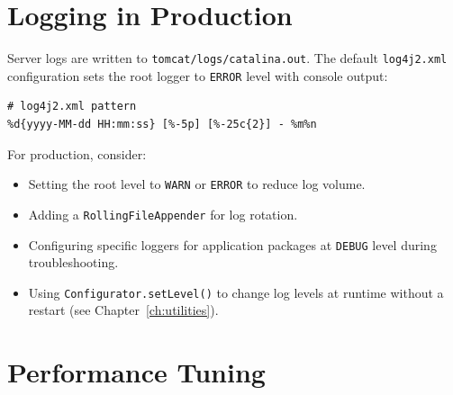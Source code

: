 \section{Logging in Production}
\label{sec:deploy-logging}

Server logs are written to \texttt{tomcat/logs/catalina.out}.  The default \texttt{log4j2.xml} configuration sets the root logger to \texttt{ERROR} level with console output:

\begin{lstlisting}[style=ini]
# log4j2.xml pattern
%d{yyyy-MM-dd HH:mm:ss} [%-5p] [%-25c{2}] - %m%n
\end{lstlisting}

\noindent
For production, consider:

\begin{itemize}
  \item Setting the root level to \texttt{WARN} or \texttt{ERROR} to reduce log volume.
  \item Adding a \texttt{RollingFileAppender} for log rotation.
  \item Configuring specific loggers for application packages at \texttt{DEBUG} level during troubleshooting.
  \item Using \texttt{Configurator.setLevel()} to change log levels at runtime without a restart (see Chapter~\ref{ch:utilities}).
\end{itemize}

\section{Performance Tuning}
\label{sec:deploy-performance}

